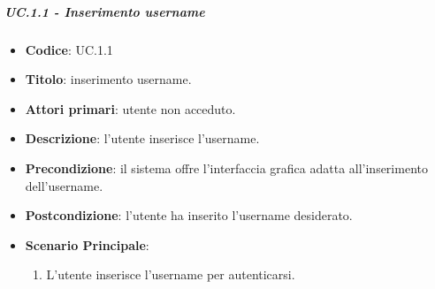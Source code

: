 		\subparagraph{UC\theuccount.1.1 - Inserimento username}
			\begin{itemize}
				\item \textbf{Codice}: UC\theuccount.1.1
				\item \textbf{Titolo}: inserimento username.
				\item \textbf{Attori primari}: utente non acceduto.
				\item \textbf{Descrizione}: l'utente inserisce l'username.
				\item \textbf{Precondizione}: il sistema offre l'interfaccia grafica adatta all'inserimento dell'username.
				\item \textbf{Postcondizione}: l'utente ha inserito l'username desiderato.
				\item \textbf{Scenario Principale}:
				\begin{enumerate}
					\item L'utente inserisce l'username per autenticarsi.
				\end{enumerate}
			\end{itemize}
		
	
